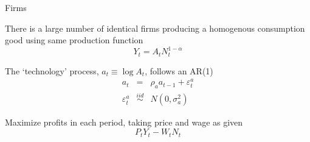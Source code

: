 

%
%
%



\begin{frame}{Firms}

There is a large number of identical firms producing a homogenous consumption good using same production function
\[
Y_{t} = A_{t}N_{t}^{1-\alpha}
\]

The `technology' process, $a_{t}\equiv \log{A_{t}}$, follows an AR(1)
\begin{eqnarray*}
a_{t} 				&=& 					\rho_{a} a_{t-1} + \varepsilon_{t}^{a} \\
\varepsilon_{t}^{a}	&\stackrel{iid}{\sim}&	N\left(0,\sigma_{a}^{2}\right)
\end{eqnarray*}

Maximize profits in each period, taking price and wage as given
\[
P_{t} Y_{t} - W_{t} N_{t}
\]

\end{frame}


